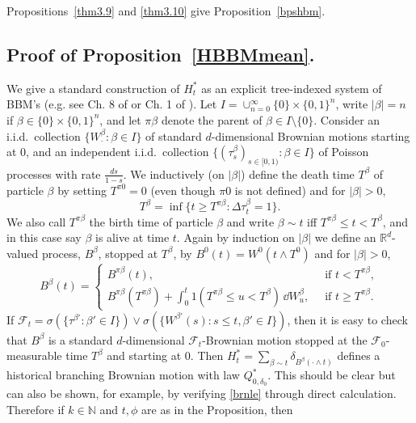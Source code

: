 \documentclass[12pt]{article}
\makeatletter
\renewenvironment{proof}[1][\proofname]{%
\par\pushQED{\qed}\normalfont%
\topsep6\p@\@plus6\p@\relax
\trivlist\item[\hskip\labelsep\bfseries#1\@addpunct{.}]%
\ignorespaces
}{%
\popQED\endtrivlist\@endpefalse
}
\numberwithin{theorem}{section}
\theoremstyle{def}
\numberwithin{equation}{section}
\newcommand{\R}{\mathbb{R}}
\newcommand{\N}{\mathbb{N}}
\newcommand{\cF}{\mathcal F}
\makeatother
\begin{document}
{\begin{proof}[Proof of Proposition~\ref{bpshbm}]
 Propositions~\ref{thm3.9} and \ref{thm3.10} give Proposition~\ref{bpshbm}.
\end{proof}


\subsection{Proof of Proposition~\ref{HBBMmean}.}\label{app:subsec:HBBMmean}
\begin{proof}[Proof of Proposition~\ref{HBBMmean}]
We give a standard construction of $H^*_t$ as an explicit tree-indexed system of BBM's (e.g. see Ch. 8 of \cite{W86} or Ch. 1 of \cite{JB}).  Let $I=\cup_{n=0}^\infty\{0\}\times\{0,1\}^n$, write $|\beta|=n$ if $\beta\in\{0\}\times\{0,1\}^n$, and let $\pi\beta$ denote the parent of $\beta\in I\setminus\{0\}$.  Consider an i.i.d.\ collection $\{W^\beta_\cdot:\beta\in I\}$ of standard $d$-dimensional Brownian motions starting at $0$, and an independent i.i.d.\ collection 
$\{(\tau^\beta_s)_{s\in[0,1)}:\beta\in I\}$ of Poisson processes with rate $\frac{ds}{1-s}$. We inductively (on $|\beta|$) define the death time $T^\beta$ of particle $\beta$ by setting $T^{\pi 0}=0$ (even though $\pi 0$ is not defined) and
for $|\beta|>0$,
\[T^\beta=\inf\{t\ge T^{\pi\beta}:\Delta \tau^\beta_t=1\}.\]
We also call $T^{\pi\beta}$ the birth time of particle $\beta$ and write $\beta\sim t$ iff $T^{\pi\beta}\le t<T^\beta$, and  in this case say $\beta$ is alive at time $t$. Again by induction on $|\beta|$ we define an $\R^d$-valued process, $B^\beta$, stopped at $T^\beta$, by $B^0(t)=W^0(t\wedge T^0)$ and for $|\beta|>0$,
\[B^\beta(t)=\begin{cases} B^{\pi\beta}(t),\ &\text{ if }t<T^{\pi\beta},\\
B^{\pi\beta}(T^{\pi\beta})+\int_0^t1(T^{\pi\beta}\le u<T^\beta)\,\dd W^\beta_u,\ &\text{ if }t\ge T^{\pi\beta}.
\end{cases}\]
If $\cF_t=\sigma(\{\tau^{\beta'}:\beta'\in I\})\vee \sigma(\{W^{\beta'}(s):s\le t, \beta'\in I\})$, then it is easy to check that $B^\beta$ is a standard $d$-dimensional $\cF_t$-Brownian motion stopped at the $\cF_0$-measurable time $T^\beta$ and starting at $0$.  
Then $H^*_t=\sum_{\beta\sim t}\delta_{B^\beta(\cdot\wedge t)}$ defines a historical branching Brownian motion with law $Q^*_{0,\delta_0}$. This should be clear but can also be shown, for example, by verifying \eqref{brnle} through direct calculation. 
Therefore if $k\in \N$ and $t,\phi$ are as in the Proposition, then

\end{proof}}
\end{document}
